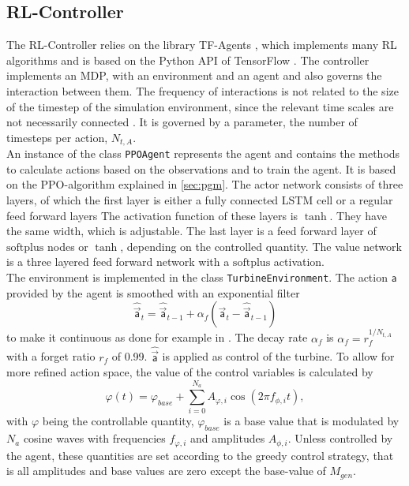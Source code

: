 \subsection{RL-Controller}
The RL-Controller relies on the library TF-Agents \cite{guadarrama_tf-agents_2018}, which implements many RL algorithms and is based on the Python API of TensorFlow \cite{abadi_tensorflow_2015}. The controller implements an MDP, with an environment and an agent and also governs the interaction between them. The frequency of interactions is not related to the size of the timestep of the simulation environment, since the relevant time scales are not necessarily connected \cite{rabault_deep_2018}. It is governed by a parameter, the number of timesteps per action, $N_{t,A}$. \\
An instance of the class \texttt{PPOAgent} represents the agent and contains the methods to calculate actions based on the observations and to train the agent. It is based on the PPO-algorithm explained in \ref{sec:pgm}. The actor network consists of three layers, of which the first layer is either a fully connected LSTM cell or a regular feed forward layers The activation function of these layers is $\tanh$. They have the same width, which is adjustable. The last layer is a feed forward layer of $\mathrm{softplus}$ nodes or $\tanh$, depending on the controlled quantity. The value network is a three layered feed forward network with a $\mathrm{softplus}$ activation. \\
The environment is implemented in the class \texttt{TurbineEnvironment}. The action $\mathsf{a}$ provided by the agent is smoothed with an exponential filter
\begin{equation}
\hat{\mathsf{\vec{a}}}_t = \hat{\mathsf{\vec{a}}}_{t-1} + \alpha_f(\mathsf{\vec{a}}_t - \hat{\mathsf{\vec{a}}}_{t-1}) \label{eq:exp_filter}
\end{equation}
to make it continuous as done for example in \cite{rabault_deep_2018}. The decay rate $\alpha_f$ is $\alpha_f = r_f^{1/N_{t,A}}$ with a forget ratio $r_f$ of \SI{0.99}{}. $\hat{\mathsf{\vec{a}}}$ is applied as control of the turbine. To allow for more refined action space, the value of the control variables is calculated by
\begin{equation}
\varphi(t) = \varphi_{base} + \sum^{N_a}_{i=0} A_{\varphi, i} \cos(2 \pi f_{\phi,i}t), \label{control_amplitude}
\end{equation}
with $\varphi$ being the controllable quantity, $\varphi_{base}$ is a base value that is modulated by $N_a$ cosine waves with frequencies $f_{\varphi,i}$ and amplitudes $A_{\phi,i}$. Unless controlled by the agent, these quantities are set according to the greedy control strategy, that is all amplitudes and base values are zero except the base-value of $M_{gen}$. \\
